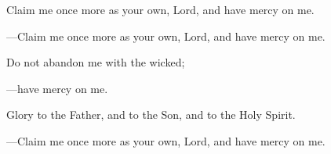 \responsory
\begin{hangpar}

Claim me once more as your own, Lord, and have mercy on me.

{\color{red}---\thinspace}Claim me once more as your own, Lord, and have mercy on me.

\medskip Do not abandon me with the wicked;

{\color{red}---\thinspace}have mercy on me.

\medskip Glory to the Father, and to the Son, and to the Holy Spirit.

{\color{red}---\thinspace}Claim me once more as your own, Lord, and have mercy on me.
\end{hangpar}
